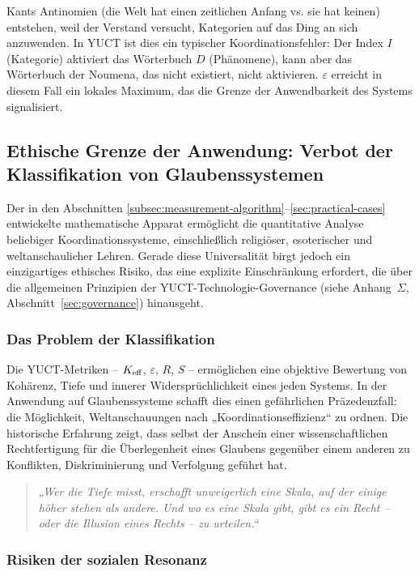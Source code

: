 \documentclass[12pt,a4paper]{article}
\newcommand{\eps}{\varepsilon}
\begin{document}
	Kants Antinomien (die Welt hat einen zeitlichen Anfang vs. sie hat keinen) entstehen, weil der Verstand versucht, Kategorien auf das Ding an sich anzuwenden. In YUCT ist dies ein typischer Koordinationsfehler: Der Index \(I\) (Kategorie) aktiviert das Wörterbuch \(D\) (Phänomene), kann aber das Wörterbuch der Noumena, das nicht existiert, nicht aktivieren. \(\eps\) erreicht in diesem Fall ein lokales Maximum, das die Grenze der Anwendbarkeit des Systems signalisiert.
	
	\subsection{Ethische Grenze der Anwendung: Verbot der Klassifikation von Glaubenssystemen}
	\label{subsec:belief-classification}
	
	Der in den Abschnitten \ref{subsec:measurement-algorithm}–\ref{sec:practical-cases} entwickelte mathematische Apparat ermöglicht die quantitative Analyse beliebiger Koordinationssysteme, einschließlich religiöser, esoterischer und weltanschaulicher Lehren. Gerade diese Universalität birgt jedoch ein einzigartiges ethisches Risiko, das eine explizite Einschränkung erfordert, die über die allgemeinen Prinzipien der YUCT-Technologie-Governance (siehe Anhang~$\Sigma$, Abschnitt~\ref{sec:governance}) hinausgeht.
	
	\subsubsection{Das Problem der Klassifikation}
	
	Die YUCT-Metriken – $\Keff$, $\eps$, $R$, $S$ – ermöglichen eine objektive Bewertung von Kohärenz, Tiefe und innerer Widersprüchlichkeit eines jeden Systems. In der Anwendung auf Glaubenssysteme schafft dies einen gefährlichen Präzedenzfall: die Möglichkeit, Weltanschauungen nach „Koordinationseffizienz“ zu ordnen. Die historische Erfahrung zeigt, dass selbst der Anschein einer wissenschaftlichen Rechtfertigung für die Überlegenheit eines Glaubens gegenüber einem anderen zu Konflikten, Diskriminierung und Verfolgung geführt hat.
	
	\begin{quote}
		\itshape
		„Wer die Tiefe misst, erschafft unweigerlich eine Skala, auf der einige höher stehen als andere. Und wo es eine Skala gibt, gibt es ein Recht – oder die Illusion eines Rechts – zu urteilen.“
	\end{quote}
	
	\subsubsection{Risiken der sozialen Resonanz}
	
\end{document}
